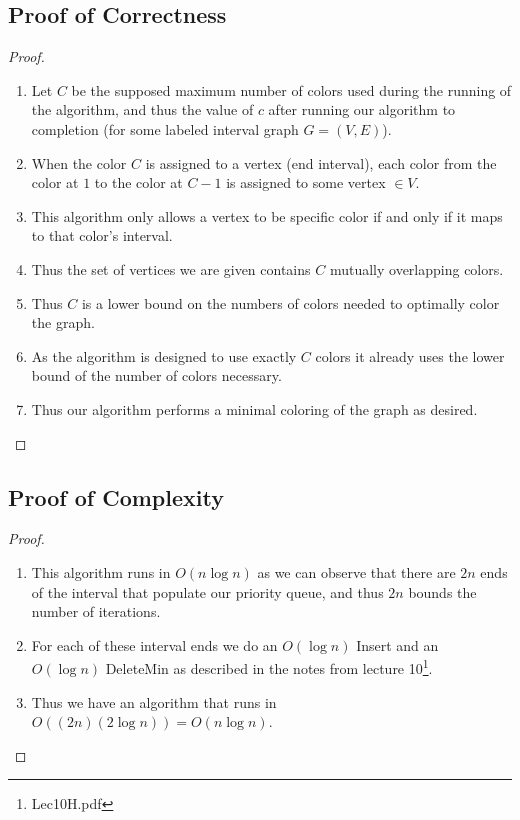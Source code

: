 \documentclass{article}
\begin{document}
\subsection{Proof of Correctness}
\begin{proof}
      \begin{enumerate}
            \item Let \(C\) be the supposed maximum number of colors used during the
                  running of the algorithm, and thus the value of \(c\) after running our
                  algorithm to completion (for some labeled interval graph \(G = (V,E)\)).
            \item When the color \(C\) is assigned to a vertex (end interval), each color
                  from the color at \(1\) to the color at \(C-1\) is assigned to some
                  vertex \( \in V\).
            \item This algorithm only allows a vertex to be specific color if and only if it maps to
                  that color's interval.
            \item Thus the set of vertices we are given contains \(C\) mutually
                  overlapping colors.
            \item Thus \(C\) is a lower bound on the numbers of colors needed to optimally
                  color the graph.
            \item As the algorithm is designed to use exactly \(C\) colors it already uses
                  the lower bound of the number of colors necessary.
            \item Thus our algorithm performs a minimal coloring of the graph as desired.
      \end{enumerate}
\end{proof}

\subsection{Proof of Complexity}
\begin{proof}
      \begin{enumerate}
            \item This algorithm runs in \(O (n \log n) \) as we can observe that there
                  are \(2n\) ends of the interval that populate our priority queue, and
                  thus \(2n\) bounds the number of iterations.
            \item For each of these interval ends we do an \( O(\log n ) \) Insert and an
                  \(O(\log n)\) DeleteMin as described in the notes from lecture 10\footnote{Lec10H.pdf}.
            \item Thus we have an algorithm that runs in \( O((2n) (2 \log n)) = O(n \log
                  n) \).
      \end{enumerate}
\end{proof}
\end{document}
